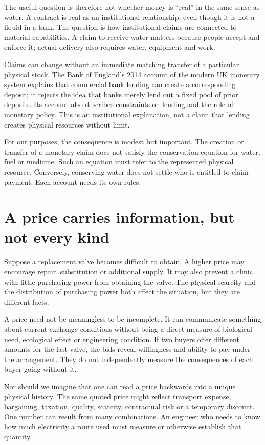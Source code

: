 The useful question is therefore not whether money is ``real'' in the same sense as water. A contract is real as an institutional relationship, even though it is not a liquid in a tank. The question is how institutional claims are connected to material capabilities. A claim to receive water matters because people accept and enforce it; actual delivery also requires water, equipment and work.

Claims can change without an immediate matching transfer of a particular physical stock. The Bank of England's 2014 account of the modern UK monetary system explains that commercial bank lending can create a corresponding deposit; it rejects the idea that banks merely lend out a fixed pool of prior deposits. Its account also describes constraints on lending and the role of monetary policy. This is an institutional explanation, not a claim that lending creates physical resources without limit.\cite{intro-boe}

For our purposes, the consequence is modest but important. The creation or transfer of a monetary claim does not satisfy the conservation equation for water, fuel or medicine. Such an equation must refer to the represented physical resource. Conversely, conserving water does not settle who is entitled to claim payment. Each account needs its own rules.

\section{A price carries information, but not every kind}
Suppose a replacement valve becomes difficult to obtain. A higher price may encourage repair, substitution or additional supply. It may also prevent a clinic with little purchasing power from obtaining the valve. The physical scarcity and the distribution of purchasing power both affect the situation, but they are different facts.

A price need not be meaningless to be incomplete. It can communicate something about current exchange conditions without being a direct measure of biological need, ecological effect or engineering condition. If two buyers offer different amounts for the last valve, the bids reveal willingness and ability to pay under the arrangement. They do not independently measure the consequences of each buyer going without it.

Nor should we imagine that one can read a price backwards into a unique physical history. The same quoted price might reflect transport expense, bargaining, taxation, quality, scarcity, contractual risk or a temporary discount. One number can result from many combinations. An engineer who needs to know how much electricity a route used must measure or otherwise establish that quantity.

